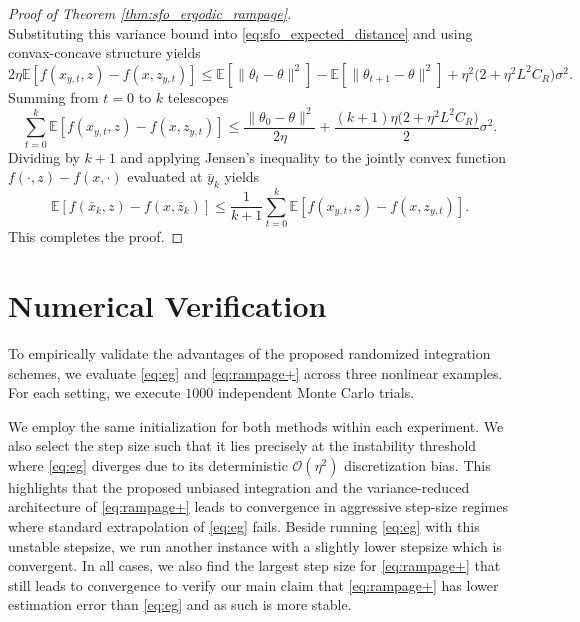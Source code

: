 \documentclass[letter,11pt]{article}
\begin{document}
\begin{proof}[Proof of Theorem \ref{thm:sfo_ergodic_rampage}]
\begin{equation}
\end{equation}
Substituting this variance bound into \eqref{eq:sfo_expected_distance} and using convax-concave structure yields
\begin{equation}
2\eta \mathbb{E} \left[ f(x_{y,t}, z) - f(x, z_{y,t}) \right] \le \mathbb{E} \left[ \|\theta_t - \theta\|^2 \right] - \mathbb{E} \left[ \|\theta_{t+1} - \theta\|^2 \right] + \eta^2 \big( 2 + \eta^2 L^2 C_R \big) \sigma^2.
\end{equation}
Summing from $t=0$ to $k$ telescopes
\begin{equation}
\sum_{t=0}^k \mathbb{E} \left[ f(x_{y,t}, z) - f(x, z_{y,t}) \right] \le \frac{\|\theta_0 - \theta\|^2}{2\eta} + \frac{(k+1)\eta \big( 2 + \eta^2 L^2 C_R \big)}{2} \sigma^2.
\end{equation}
Dividing by $k+1$ and applying Jensen's inequality to the jointly convex function $f(\cdot, z) - f(x, \cdot)$ evaluated at $\bar{y}_k$ yields
\begin{equation}
\mathbb{E} \left[ f(\bar{x}_k, z) - f(x, \bar{z}_k) \right] \le \frac{1}{k+1} \sum_{t=0}^k \mathbb{E} \left[ f(x_{y,t}, z) - f(x, z_{y,t}) \right].
\end{equation}
This completes the proof.
\end{proof}
\section{Numerical Verification}\label{sec:exp}
To empirically validate the advantages of the proposed randomized integration schemes, we evaluate \eqref{eq:eg} and \eqref{eq:rampage+} across three nonlinear examples. For each setting, we execute $1000$ independent Monte Carlo trials. 

We employ the same initialization for both methods within each experiment. We also select the step size such that it lies precisely at the instability threshold where \eqref{eq:eg} diverges due to its deterministic $\mathcal{O}(\eta^2)$ discretization bias. This highlights that the proposed unbiased integration and the variance-reduced architecture of \eqref{eq:rampage+} leads to convergence in aggressive step-size regimes where standard extrapolation of \eqref{eq:eg} fails. Beside running \eqref{eq:eg} with this unstable stepsize, we run another instance with a slightly lower stepsize which is convergent. In all cases, we also find the largest step size for \eqref{eq:rampage+} that still leads to convergence to verify our main claim that \eqref{eq:rampage+} has lower estimation error than \eqref{eq:eg} and as such is more stable.
\end{document}
